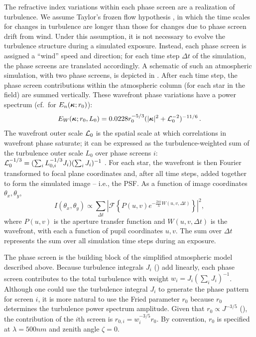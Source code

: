\documentclass[twocolumn]{aastex631}
\begin{document}
The refractive index variations within each phase screen are a realization of \vk turbulence.
We assume Taylor's frozen flow hypothesis \citep{taylor_spectrum_1938}, in which the time scales for changes in turbulence are longer than those for changes due to phase screen drift from wind. 
Under this assumption, it is not necessary to evolve the turbulence structure during a simulated exposure. 
Instead, each phase screen is assigned a ``wind'' speed and direction; for each time step $\Delta t$ of the simulation, the phase screens are translated accordingly. 
A schematic of such an atmospheric simulation, with two phase screens, is depicted in .
After each time step, the phase screen contributions within the atmospheric column (for each star in the field) are summed vertically. 
These wavefront phase variations have a \vonkarman power spectrum (cf.\, for $E_n(\boldsymbol{\kappa}; r_0)$): 
\begin{equation}
    E_W(\vect{\kappa};r_0,L_0) = 0.0228r_0^{-5/3}(|\vect{\kappa}|^2+\Lnot^{-2})^{-11/6}\,.
\end{equation}
The wavefront outer scale $\mathcal{L}_0$ is the spatial scale at which correlations in wavefront phase saturate; it can be expressed as the turbulence-weighted sum of the turbulence outer scale $L_0$ over phase screens $i$: $\mathcal{L}_0^{-1/3} = (\sum_i L_{0,i}^{-1/3}J_i)(\sum_iJ_i)^{-1}$ \citep{borgnino_estimation_1990, tokovinin_wavefront_1998}.
For each star, the wavefront is then Fourier transformed to focal plane coordinates and, after all time steps, added together to form the simulated image -- i.e., the PSF.
As a function of image coordinates $\theta_x,\theta_y$, 
\begin{equation}
    I(\theta_x,\theta_y) \propto \sum_{\Delta t} \left| \mathcal{F} \left\{ P(u,v) e^{-\frac{2\pi i}{\lambda}W(u,v, \Delta t)} \right\} \right|^2,
\end{equation}
where $P(u,v)$ is the aperture transfer function and $W(u,v,\Delta t)$ is the wavefront, with each a function of pupil coordinates $u,v$.
The sum over $\Delta t$ represents the sum over all simulation time steps during an exposure.

The phase screen is the building block of the simplified atmospheric model described above. 
Because turbulence integrals $J_i$ () add linearly, each phase screen contributes to the total turbulence with weight $w_i = J_i(\sum_i J_i)^{-1}$.
Although one could use the turbulence integral $J_i$ to generate the phase pattern for screen $i$, it is more natural to use the Fried parameter $r_0$ because $r_0$ determines the turbulence power spectrum amplitude.
Given that $r_0 \propto J^{-3/5}$ (),
the contribution of the $i$th screen is
$r_{0,i} =  w_i^{-3/5} r_0$.
By convention, $r_0$ is specified at $\lambda=500\unit{nm}$ and zenith angle $\zeta=0$. 
\end{document}
